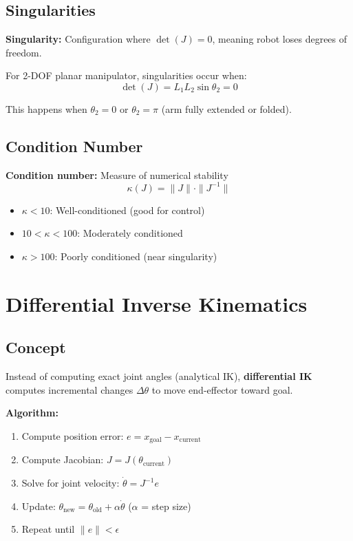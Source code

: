 \documentclass[11pt,a4paper]{article}
\begin{document}
\subsection{Singularities}

\textbf{Singularity:} Configuration where $\det(J) = 0$, meaning robot loses degrees of freedom.

For 2-DOF planar manipulator, singularities occur when:
\begin{equation}
\det(J) = L_1 L_2 \sin\theta_2 = 0
\end{equation}

This happens when $\theta_2 = 0$ or $\theta_2 = \pi$ (arm fully extended or folded).

\subsection{Condition Number}

\textbf{Condition number:} Measure of numerical stability
\begin{equation}
\kappa(J) = \|J\| \cdot \|J^{-1}\|
\end{equation}

\begin{itemize}
    \item $\kappa < 10$: Well-conditioned (good for control)
    \item $10 < \kappa < 100$: Moderately conditioned
    \item $\kappa > 100$: Poorly conditioned (near singularity)
\end{itemize}

\section{Differential Inverse Kinematics}

\subsection{Concept}

Instead of computing exact joint angles (analytical IK), \textbf{differential IK} computes incremental changes $\Delta\theta$ to move end-effector toward goal.

\textbf{Algorithm:}
\begin{enumerate}
    \item Compute position error: $e = x_{\text{goal}} - x_{\text{current}}$
    \item Compute Jacobian: $J = J(\theta_{\text{current}})$
    \item Solve for joint velocity: $\dot{\theta} = J^{-1} e$
    \item Update: $\theta_{\text{new}} = \theta_{\text{old}} + \alpha \dot{\theta}$ ($\alpha$ = step size)
    \item Repeat until $\|e\| < \epsilon$
\end{enumerate}
\end{document}
